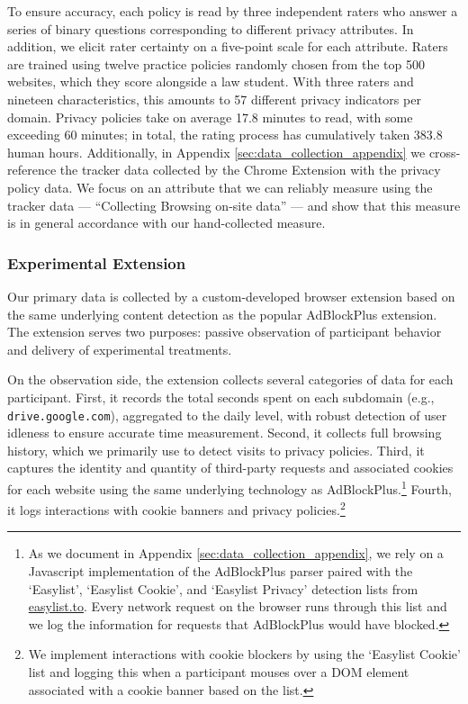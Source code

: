 \documentclass[12pt]{article}
\theoremstyle{definition}
\theoremstyle{remark}
\begin{document}
To ensure accuracy, each policy is read by three independent raters who answer a series of binary questions corresponding to different privacy attributes. In addition, we elicit rater certainty on a five-point scale for each attribute. Raters are trained using twelve practice policies randomly chosen from the top 500 websites, which they score alongside a law student. With three raters and nineteen characteristics, this amounts to 57 different privacy indicators per domain. %
Privacy policies take on average 17.8 minutes to read, with some exceeding 60 minutes; in total, the rating process has cumulatively taken 383.8 human hours. %
Additionally, in Appendix \ref{sec:data_collection_appendix} we cross-reference the tracker data collected by the Chrome Extension with the privacy policy data. We focus on an attribute that we can reliably measure using the tracker data --- ``Collecting Browsing on-site data'' --- and show that this measure is in general accordance with our hand-collected measure.

\subsubsection{Experimental Extension}\label{sec:extension}

Our primary data is collected by a custom-developed browser extension based on the same underlying content detection as the popular AdBlockPlus extension. The extension serves two purposes: passive observation of participant behavior and delivery of experimental treatments.
 
On the observation side, the extension collects several categories of data for each participant. First, it records the total seconds spent on each subdomain (e.g., \texttt{drive.google.com}), aggregated to the daily level, with robust detection of user idleness to ensure accurate time measurement. Second, it collects full browsing history, which we primarily use to detect visits to privacy policies. Third, it captures the identity and quantity of third-party requests and associated cookies for each website using the same underlying technology as AdBlockPlus.\footnote{As we document in Appendix \ref{sec:data_collection_appendix}, we rely on a Javascript implementation of the AdBlockPlus parser paired with the `Easylist', `Easylist Cookie', and `Easylist Privacy' detection lists from \url{easylist.to}. Every network request on the browser runs through this list and we log the information for requests that AdBlockPlus would have blocked.} Fourth, it logs interactions with cookie banners and privacy policies.\footnote{We implement interactions with cookie blockers by using the `Easylist Cookie' list and logging this when a participant mouses over a DOM element associated with a cookie banner based on the list.}
 
\end{document}
